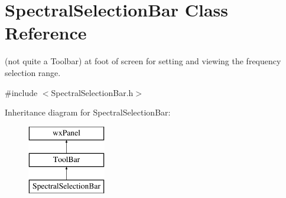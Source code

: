 \hypertarget{class_spectral_selection_bar}{}\section{Spectral\+Selection\+Bar Class Reference}
\label{class_spectral_selection_bar}


(not quite a Toolbar) at foot of screen for setting and viewing the frequency selection range.  




{\ttfamily \#include $<$Spectral\+Selection\+Bar.\+h$>$}

Inheritance diagram for Spectral\+Selection\+Bar\+:\begin{figure}[H]
\begin{center}
\leavevmode
\includegraphics[height=3.000000cm]{class_spectral_selection_bar}
\end{center}
\end{figure}

